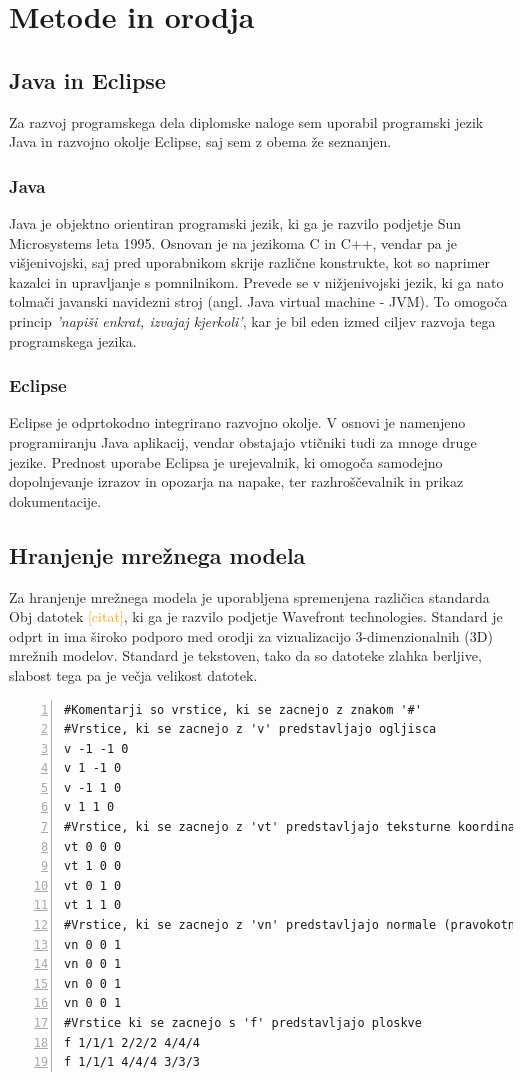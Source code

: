 \documentclass[a4paper, 12pt]{book}
\begin{document}
\chapter{Metode in orodja}
\section{Java in Eclipse}
Za razvoj programskega dela diplomske naloge sem uporabil programski jezik Java in razvojno okolje Eclipse, saj sem z obema že seznanjen.
\subsection*{Java}
Java je objektno orientiran programski jezik, ki ga je razvilo podjetje Sun Microsystems leta 1995. Osnovan je na jezikoma C in C++, vendar pa je višjenivojski, saj pred uporabnikom skrije različne konstrukte, kot so naprimer kazalci in upravljanje s pomnilnikom. Prevede se v nižjenivojski jezik, ki ga nato tolmači javanski navidezni stroj (angl. Java virtual machine - JVM). To omogoča princip \emph{'napiši enkrat, izvajaj kjerkoli'}, kar je bil eden izmed ciljev razvoja tega programskega jezika.
\subsection*{Eclipse}
Eclipse je odprtokodno integrirano razvojno okolje. V osnovi je namenjeno programiranju Java aplikacij, vendar obstajajo vtičniki tudi za mnoge druge jezike. Prednost uporabe Eclipsa je urejevalnik, ki omogoča samodejno dopolnjevanje izrazov in opozarja na napake, ter razhroščevalnik in prikaz dokumentacije.
\section{Hranjenje mrežnega modela}

Za hranjenje mrežnega modela je uporabljena spremenjena različica standarda Obj datotek \textcolor{orange}{[citat]}, ki ga je razvilo podjetje Wavefront technologies. Standard je odprt in ima široko podporo med orodji za vizualizacijo 3-dimenzionalnih (3D) mrežnih modelov. Standard je tekstoven, tako da so datoteke zlahka berljive, slabost tega pa je večja velikost datotek.
\renewcommand{\lstlistingname}{Datoteka}
\renewcommand{\lstlistlistingname}{Seznam datotek}
\footnotesize{
\begin{lstlisting}[captionpos=b, frame=single, caption={Primer obj datoteke, ki predstavlja kvadrat.}, breaklines=true, firstline=1, numbers=left]
#Komentarji so vrstice, ki se zacnejo z znakom '#'
#Vrstice, ki se zacnejo z 'v' predstavljajo ogljisca 
v -1 -1 0
v 1 -1 0
v -1 1 0
v 1 1 0
#Vrstice, ki se zacnejo z 'vt' predstavljajo teksturne koordinate
vt 0 0 0
vt 1 0 0
vt 0 1 0
vt 1 1 0
#Vrstice, ki se zacnejo z 'vn' predstavljajo normale (pravokotnice?)
vn 0 0 1
vn 0 0 1
vn 0 0 1
vn 0 0 1
#Vrstice ki se zacnejo s 'f' predstavljajo ploskve
f 1/1/1 2/2/2 4/4/4
f 1/1/1 4/4/4 3/3/3
\end{lstlisting}}
\end{document}

